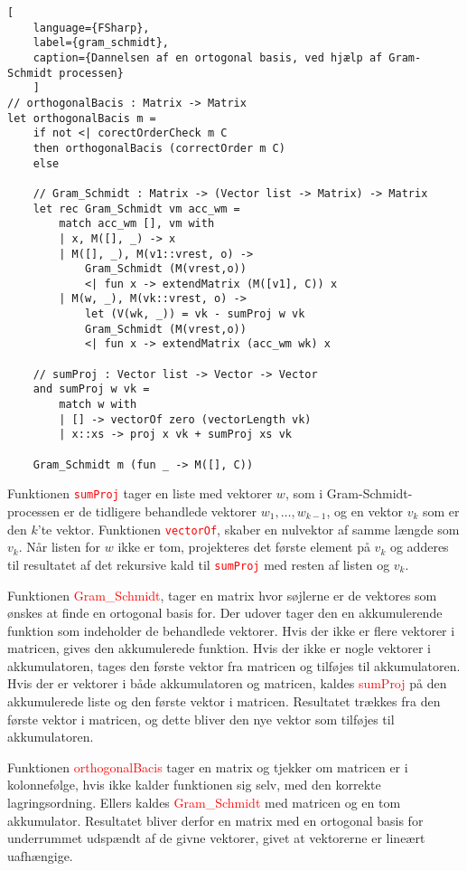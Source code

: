 \begin{lstlisting}[
    language={FSharp}, 
    label={gram_schmidt}, 
    caption={Dannelsen af en ortogonal basis, ved hjælp af Gram-Schmidt processen}
    ]
// orthogonalBacis : Matrix -> Matrix
let orthogonalBacis m =
    if not <| corectOrderCheck m C  
    then orthogonalBacis (correctOrder m C)
    else

    // Gram_Schmidt : Matrix -> (Vector list -> Matrix) -> Matrix
    let rec Gram_Schmidt vm acc_wm =
        match acc_wm [], vm with
        | x, M([], _) -> x 
        | M([], _), M(v1::vrest, o) -> 
            Gram_Schmidt (M(vrest,o)) 
            <| fun x -> extendMatrix (M([v1], C)) x 
        | M(w, _), M(vk::vrest, o) -> 
            let (V(wk, _)) = vk - sumProj w vk
            Gram_Schmidt (M(vrest,o)) 
            <| fun x -> extendMatrix (acc_wm wk) x

    // sumProj : Vector list -> Vector -> Vector
    and sumProj w vk =
        match w with
        | [] -> vectorOf zero (vectorLength vk)
        | x::xs -> proj x vk + sumProj xs vk
        
    Gram_Schmidt m (fun _ -> M([], C))
\end{lstlisting}


Funktionen \textcolor{red}{\texttt{sumProj}} tager en liste med vektorer \(w\), som i Gram-Schmidt-processen er de tidligere behandlede vektorer \(w_1, \ldots, w_{k-1}\), og en vektor \(v_k\) som er den \(k\)'te vektor. Funktionen \textcolor{red}{\texttt{vectorOf}}, skaber en nulvektor af samme længde som \(v_k\). Når listen for \(w\) ikke er tom, projekteres det første element på \(v_k\) og adderes til resultatet af det rekursive kald til \textcolor{red}{\texttt{sumProj}} med resten af listen og \(v_k\).

Funktionen \textcolor{red}{Gram\_Schmidt}, tager en matrix hvor søjlerne er de vektores som ønskes at finde en ortogonal basis for. Der udover tager den en akkumulerende funktion som indeholder de behandlede vektorer. Hvis der ikke er flere vektorer i matricen, gives den akkumulerede funktion. Hvis der ikke er nogle vektorer i akkumulatoren, tages den første vektor fra matricen og tilføjes til akkumulatoren. Hvis der er vektorer i både akkumulatoren og matricen, kaldes \textcolor{red}{sumProj} på den akkumulerede liste og den første vektor i matricen. Resultatet trækkes fra den første vektor i matricen, og dette bliver den nye vektor som tilføjes til akkumulatoren. 

Funktionen \textcolor{red}{orthogonalBacis} tager en matrix og tjekker om matricen er i kolonnefølge, hvis ikke kalder funktionen sig selv, med den korrekte lagringsordning. Ellers kaldes \textcolor{red}{Gram\_Schmidt} med matricen og en tom akkumulator. Resultatet bliver derfor en matrix med en ortogonal basis for underrummet udspændt af de givne vektorer, givet at vektorerne er lineært uafhængige.

